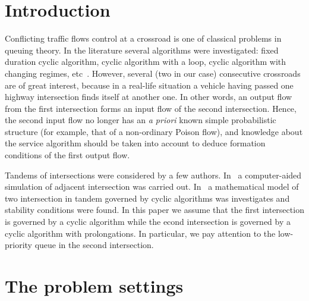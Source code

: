 \documentclass[runningheads,a4paper]{llncs}
\begin{document}
\section{Introduction}

Conflicting traffic flows control at a crossroad is one of classical problems in queuing theory. In
the literature several algorithms were investigated: fixed duration cyclic algorithm, cyclic
algorithm with a loop, cyclic algorithm with changing regimes,
etc~\cite{n:f:p:1968,f:1977,f:1977-1,l:f:2000,p:f:2008,a:b:2010}. However, several (two in our case)
consecutive crossroads are of great interest, because in a real-life situation a vehicle
having passed one highway intersection finds itself at another one. In other words, an output flow from
the first intersection forms an input flow of the second intersection. Hence, the second input flow
no longer has an \textit{a priori} known simple probabilistic structure (for example, that of a
non-ordinary Poison flow), and knowledge about the service algorithm should be taken into account
to deduce formation conditions of the first output flow.

Tandems of intersections were considered by a few authors. In~\cite{y:l:1985} a computer-aided
simulation of adjacent intersection was carried out. In~\cite{z:2012} a mathematical model of two
intersection in tandem governed by cyclic algorithms was investigates and stability conditions were
found. In this paper we assume that the first intersection is governed by a cyclic algorithm while
the econd intersection is governed by a cyclic algorithm with prolongations. In particular, we pay
attention to the low-priority queue in the second intersection.

\section{The  problem settings}
\end{document}
